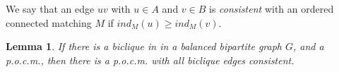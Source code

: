 \documentclass[12 pt]{article}
\newtheorem{lemma}{Lemma}
\begin{document}
We say that an edge $uv$ with $u\in A$ and $v \in B$ is \textit{consistent} with an ordered connected matching $M$ if $ind_M(u) \geq ind_M(v)$. 
\begin{lemma}
	If there is a biclique in in a balanced bipartite graph $G$, and a p.o.c.m., then there is a p.o.c.m. with all biclique edges consistent. 
\end{lemma}
\end{document}
